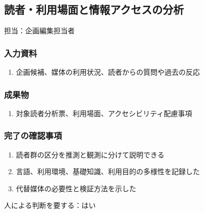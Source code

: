 \documentclass[a4paper,11pt]{article}
\begin{document}
\subsection{読者・利用場面と情報アクセスの分析}
\par 担当：企画編集担当者\par\medskip
\subsubsection*{入力資料}
\begin{enumerate}[leftmargin=2em,itemsep=0.35em]
\item 企画候補、媒体の利用状況、読者からの質問や過去の反応
\end{enumerate}
\subsubsection*{成果物}
\begin{enumerate}[leftmargin=2em,itemsep=0.35em]
\item 対象読者分析票、利用場面、アクセシビリティ配慮事項
\end{enumerate}
\subsubsection*{完了の確認事項}
\begin{enumerate}[leftmargin=2em,itemsep=0.35em]
\item 読者群の区分を推測と観測に分けて説明できる
\item 言語、利用環境、基礎知識、利用目的の多様性を記録した
\item 代替媒体の必要性と検証方法を示した
\end{enumerate}
\par 人による判断を要する：はい\par\medskip
\end{document}
